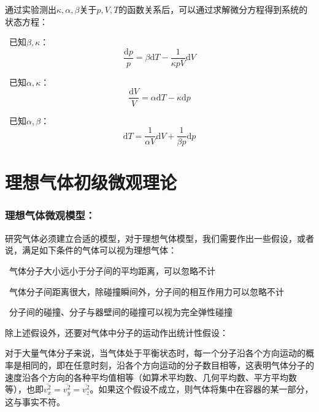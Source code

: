 \documentclass[zihao=-4,UTF8]{report}
\begin{document}
通过实验测出$\kappa,\alpha,\beta$关于$p,V,T$的函数关系后，可以通过求解微分方程得到系统的状态方程：\par
{}\ 已知$\beta,\kappa$：
\begin{equation}
    \frac{\mathrm{d}p}{p} = \beta\mathrm{d}T - \frac{1}{\kappa pV}\mathrm{d}V
\end{equation}\par
{}\ 已知$\alpha,\kappa$：
\begin{equation}
    \frac{\mathrm{d}V}{V} = \alpha \mathrm{d}T - \kappa \mathrm{d}p
\end{equation}\par
{}\ 已知$\alpha,\beta$：
\begin{equation}
    \mathrm{d}T = \frac{1}{\alpha V}\mathrm{d}V + \frac{1}{\beta p}\mathrm{d}p
\end{equation}

\section{理想气体初级微观理论}

\subsubsection{理想气体微观模型：}
研究气体必须建立合适的模型，对于理想气体模型，我们需要作出一些假设，或者说，满足如下条件的气体可以视为理想气体：\par
{}\ 气体分子大小远小于分子间的平均距离，可以忽略不计\par
{}\ 气体分子间距离很大，除碰撞瞬间外，分子间的相互作用力可以忽略不计\par
{}\ 分子间的碰撞、分子与器壁间的碰撞可以视为完全弹性碰撞\par
除上述假设外，还要对气体中分子的运动作出统计性假设：\par
对于大量气体分子来说，当气体处于平衡状态时，每一个分子沿各个方向运动的概率是相同的，即在任意时刻，沿各个方向运动的分子数目相等，这表明气体分子的速度沿各个方向的各种平均值相等（如算术平均数、几何平均数、平方平均数等），也即$\overline{v^2_x}=\overline{v^2_y}=\overline{v^2_z}$。如果这个假设不成立，则气体将集中在容器的某一部分，这与事实不符。
\end{document}
